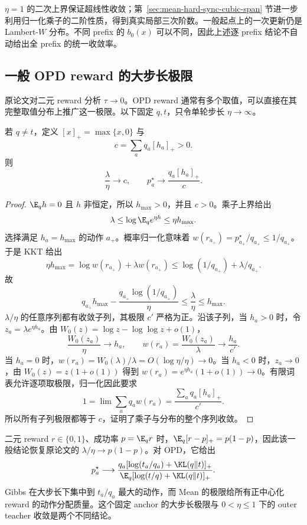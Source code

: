 $\eta=1$ 的二次上界保证超线性收敛；第~\ref{sec:mean-hard-sync-cubic-span} 节进一步利用归一化乘子的二阶性质，得到真实局部三次阶数。一般起点上的一次更新仍是 Lambert-$W$ 分布。不同 prefix 的 $b_0(x)$ 可以不同，因此上述逐 prefix 结论不自动给出全 prefix 的统一收敛率。

\subsection{一般 OPD reward 的大步长极限}

原论文对二元 reward 分析 $\tau\to0$。OPD reward 通常有多个取值，可以直接在其完整取值分布上推广这一极限。以下固定 $q,t$，只令单轮步长 $\eta\to\infty$。

\begin{proposition}
\label{prop:mean-opd-large-eta}
若 $q\ne t$，定义 $[x]_+=\max\{x,0\}$ 与
\[
 c=\sum_aq_a[h_a]_+>0.
\]
则
\begin{equation}
 \frac{\lambda}{\eta}\longrightarrow c,
 \qquad
 p_a^\star\longrightarrow\frac{q_a[h_a]_+}{c}.
 \label{eq:mean-opd-large-eta}
\end{equation}
\end{proposition}

\begin{proof}
$\E_qh=0$ 且 $h$ 非恒定，所以 $h_{\max}>0$，并且 $c>0$。乘子上界给出
\[
 \lambda\le\log\E_qe^{\eta h}\le\eta h_{\max}.
\]
选择满足 $h_a=h_{\max}$ 的动作 $a_+$。概率归一化意味着 $w(r_{a_+})=p_{a_+}^\star/q_{a_+}\le1/q_{a_+}$。于是 KKT 给出
\[
 \eta h_{\max}
 =\log w(r_{a_+})+\lambda w(r_{a_+})
 \le\log(1/q_{a_+})+\lambda/q_{a_+}.
\]
故
\[
 q_{a_+}h_{\max}-\frac{q_{a_+}\log(1/q_{a_+})}{\eta}
 \le\frac{\lambda}{\eta}\le h_{\max}.
\]
$\lambda/\eta$ 的任意序列都有收敛子列，其极限 $c'$ 严格为正。沿该子列，当 $h_a>0$ 时，令 $z_a=\lambda e^{\eta h_a}$。由 $W_0(z)=\log z-\log\log z+o(1)$，
\[
 \frac{W_0(z_a)}{\eta}\to h_a,
 \qquad w(r_a)=\frac{W_0(z_a)}{\lambda}\to\frac{h_a}{c'}.
\]
当 $h_a=0$ 时，$w(r_a)=W_0(\lambda)/\lambda=O(\log\eta/\eta)\to0$。当 $h_a<0$ 时，$z_a\to0$，由 $W_0(z)=z(1+o(1))$ 得到 $w(r_a)=e^{\eta h_a}(1+o(1))\to0$。有限词表允许逐项取极限，归一化因此要求
\[
 1=\lim\sum_aq_aw(r_a)=\frac{\sum_aq_a[h_a]_+}{c'}.
\]
所以所有子列极限都等于 $c$，证明了乘子与分布的整个序列收敛。
\end{proof}

二元 reward $r\in\{0,1\}$、成功率 $p=\E_qr$ 时，$\E_q[r-p]_+=p(1-p)$，因此该一般结论恢复原论文的 $\lambda/\eta\to p(1-p)$。对 OPD，它给出
\[
 p_a^\star\longrightarrow
 \frac{q_a[\log(t_a/q_a)+\KL(q\Vert t)]_+}
 {\E_q[\log(t/q)+\KL(q\Vert t)]_+}.
\]
Gibbs 在大步长下集中到 $t_a/q_a$ 最大的动作，而 Mean 的极限给所有正中心化 reward 的动作分配质量。这个固定 anchor 的大步长极限与 $0<\eta\le1$ 下的 outer teacher 收敛是两个不同结论。

